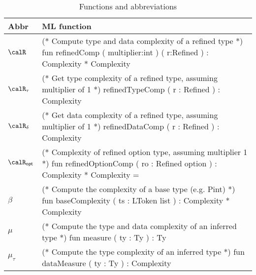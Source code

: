 \begin{longtable}{||l|l||}
\caption[Functions and abbreviations]{Functions and abbreviations}
\label{tab:v2Abbreviations}
\\\hline
\hline
Abbr & ML function \\\hline\hline
$\calR$ &
\parbox[t]{9cm}{
\scriptsize
(* Compute type and data complexity of a refined type *)\linebreak
fun refinedComp ( multiplier:int ) ( r:Refined ) : Complexity * Complexity
\normalsize
\vspace{0.5mm}} \\\hline

$\calR_\tau$ &
\parbox[t]{9cm}{
\scriptsize
(* Get type complexity of a refined type, assuming multiplier of 1 *)\linebreak
refinedTypeComp ( r : Refined ) : Complexity
\normalsize
\vspace{0.5mm}} \\\hline

$\calR_\delta$ &
\parbox[t]{9cm}{
\scriptsize
(* Get data complexity of a refined type, assuming multiplier of 1 *)\linebreak
refinedDataComp ( r : Refined ) : Complexity
\normalsize
\vspace{0.5mm}} \\\hline

$\calR_{\mathsf{opt}}$ &
\parbox[t]{9cm}{
\scriptsize
(* Complexity of refined option type, assuming multiplier 1 *)
fun refinedOptionComp ( ro : Refined option ) : Complexity * Complexity =
\normalsize
\vspace{0.5mm}} \\\hline

$\beta$ &
\parbox[t]{9cm}{
\scriptsize
(* Compute the complexity of a base type (e.g. Pint) *)\linebreak
fun baseComplexity ( ts : LToken list ) : Complexity * Complexity
\normalsize
\vspace{0.5mm}} \\\hline

$\mu$ &
\parbox[t]{9cm}{
\scriptsize
(* Compute the type and data complexity of an inferred type *)\linebreak
fun measure ( ty : Ty ) : Ty
\normalsize
\vspace{0.5mm}} \\\hline

$\mu_\tau$ &
\parbox[t]{9cm}{
\scriptsize
(* Compute the type complexity of an inferred type *)\linebreak
fun dataMeasure ( ty : Ty ) : Complexity
\normalsize
\vspace{0.5mm}} \\\hline


\end{longtable}
